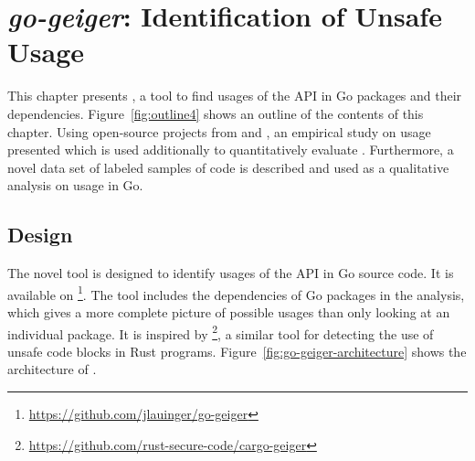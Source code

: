
\chapter{\textit{go-geiger}: Identification of Unsafe Usage}\label{ch:go-geiger}

This chapter presents \toolGeiger{}, a tool to find usages of the \unsafe{} \acrshort{API} in Go packages and their
dependencies.
Figure~\ref{fig:outline4} shows an outline of the contents of this chapter.
Using open-source projects from \github{} and \toolGeiger{}, an empirical study on \unsafe{} usage presented which is
used additionally to quantitatively evaluate \toolGeiger{}.
Furthermore, a novel data set of labeled samples of \unsafe{} code is described and used as a qualitative analysis on
\unsafe{} usage in Go.





\section{Design}\label{sec:go-geiger:design}

The novel tool \toolGeiger{} is designed to identify usages of the \unsafe{} \acrshort{API} in Go source code.
It is available on \github{}\footnote{\url{https://github.com/jlauinger/go-geiger}}.
The tool includes the dependencies of Go packages in the analysis, which gives a more complete picture of possible
\unsafe{} usages than only looking at an individual package.
It is inspired by \toolCargoGeiger{}\footnote{\url{https://github.com/rust-secure-code/cargo-geiger}}, a similar tool
for detecting the use of unsafe code blocks in Rust programs.
Figure~\ref{fig:go-geiger-architecture} shows the architecture of \toolGeiger{}.



